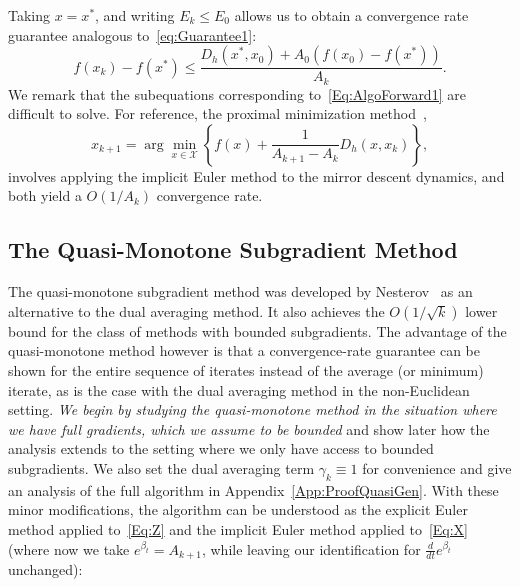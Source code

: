 \documentclass[11pt]{article}
\theoremstyle{plain}
\newcommand{\X}{{\mathcal X}}
\begin{document}
\noindent Taking $x = x^\ast$, and writing $E_k \leq E_0$ allows us to obtain a convergence rate guarantee analogous to~\eqref{eq:Guarantee1}:
\begin{equation}
f(x_k) - f(x^\ast) \leq \frac{D_h(x^\ast, x_0) + A_0 (f(x_0) - f(x^\ast))}{A_k}.
\end{equation} 
%
We remark that the subequations corresponding to~\eqref{Eq:AlgoForward1} are difficult to solve. For reference, the proximal minimization method~\cite{ChenTeboulle93}, 
\begin{equation}
x_{k+1} = \arg\min_{x\in\X} \left\{ f(x) + \frac{1}{A_{k+1} - A_k}D_h\left(x, x_k\right)\right\},
\end{equation}
involves applying the implicit Euler method to the mirror descent dynamics, and both yield a $O(1/A_k)$ convergence rate. 

\subsection{The Quasi-Monotone Subgradient Method}
\label{Sec:QuasiMono}
The quasi-monotone subgradient method was developed by Nesterov~\cite{Nesterov15} as an alternative to the dual averaging method.  It also achieves the $O(1/\sqrt{k})$ lower bound for the class of methods with bounded subgradients. The advantage of the quasi-monotone method however is that a convergence-rate guarantee can be shown for the entire sequence of iterates instead of the average (or minimum) iterate, as is the case with the dual averaging method in the non-Euclidean setting. {\em We begin by studying the quasi-monotone method in the situation where we have full gradients, which we assume to be bounded} and show later how the analysis extends to the setting where we only have access to bounded subgradients. We also set the dual averaging term $\gamma_k \equiv 1$ for convenience and give an analysis of the full algorithm in Appendix~\ref{App:ProofQuasiGen}.  With these minor modifications, the algorithm can be understood as the explicit Euler method applied to~\eqref{Eq:Z} and the implicit Euler method applied to~\eqref{Eq:X} (where now we take $e^{\beta_t} = A_{k+1}$, while leaving our identification for $\frac{d}{dt} e^{\beta_t}$ unchanged):
\end{document}
